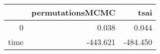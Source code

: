 \begin{table}[ht]
\centering
\begingroup\tiny
\begin{tabular}{rrr}
  \hline
 & permutationsMCMC & tsai \\ 
  \hline
0 & 0.038 & 0.044 \\ 
  time & -443.621 & -484.450 \\ 
   \hline
\end{tabular}
\endgroup
\end{table}
